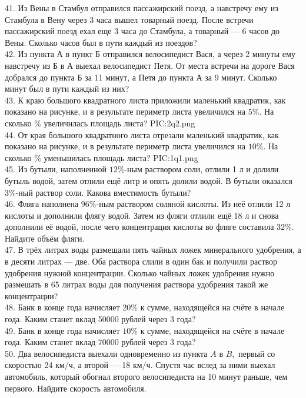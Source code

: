 41. Из Вены в Стамбул отправился пассажирский поезд, а навстречу ему из Стамбула в Вену через 3 часа вышел товарный поезд. После встречи пассажирский поезд ехал еще 3 часа до Стамбула, а товарный ---
6 часов до Вены. Сколько часов был в пути каждый из поездов?\\
42. Из пункта А в пункт Б отправился велосипедист Вася, а через 2 минуты ему навстречу из Б в А выехал велосипедист Петя. От места встречи на дороге Вася добрался до пункта Б за 11 минут, а Петя до пункта А за 9 минут. Сколько минут был в пути каждый из них?\\
43. К краю большого квадратного листа приложили маленький квадратик, как показано на рисунке, и в результате периметр листа увеличился на $5\%.$ На сколько $\%$ увеличилась площадь листа?
{{PIC:2q2.png}}\\
44. От края большого квадратного листа отрезали маленький квадратик, как показано на рисунке, и в результате периметр листа увеличился на $10\%.$ На сколько $\%$ уменьшилась площадь листа?
{{PIC:1q1.png}}\\
45. Из бутыли, наполненной $12\%$-ным раствором соли, отлили 1 л и долили бутыль водой, затем отлили ещё литр и опять долили водой. В бутыли оказался $3\%$-ный раствор соли. Какова вместимость бутыли?\\
46. Фляга наполнена $96\%$-ным раствором соляной кислоты. Из неё отлили 12 л кислоты и дополнили флягу водой. Затем из фляги отлили ещё 18 л и снова дополнили её водой, после чего концентрация кислоты во фляге составила $32\%.$ Найдите объём фляги.\\
47. В трёх литрах воды размешали пять чайных ложек минерального удобрения, а в десяти литрах --- две. Оба раствора слили в один бак и получили раствор удобрения нужной концентрации. Сколько чайных ложек удобрения нужно размешать в 65 литрах воды для получения раствора удобрения такой же концентрации?\\
48. Банк в конце года начисляет $20\%$ к сумме, находящейся на счёте в начале года. Каким станет вклад 50000 рублей через 3 года?\\
49. Банк в конце года начисляет $10\%$ к сумме, находящейся на счёте в начале года. Каким станет вклад 70000 рублей через 3 года?\\
50. Два велосипедиста выехали одновременно из пункта $A$ в $B,$ первый со скоростью 24 км/ч, а второй --- 18 км/ч. Спустя час вслед за ними выехал автомобиль, который обогнал второго велосипедиста на 10 минут раньше, чем первого. Найдите скорость автомобиля.\\
